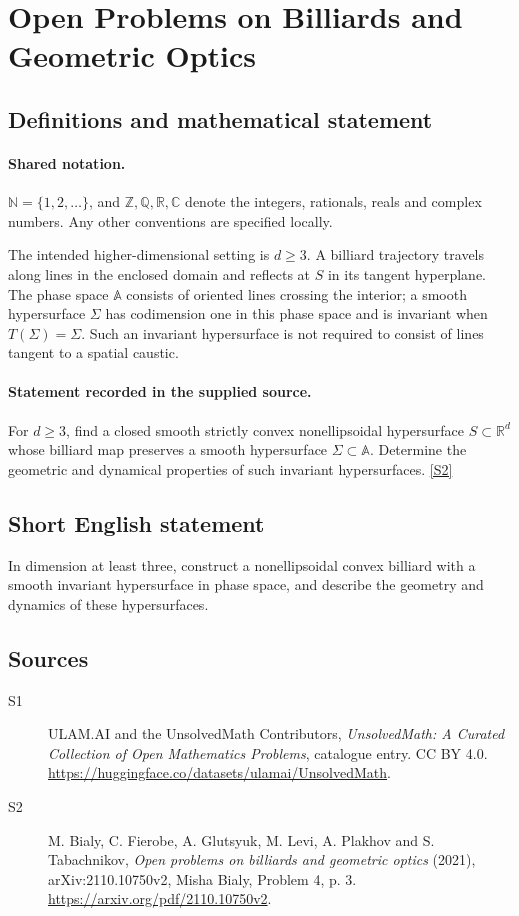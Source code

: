 \documentclass[11pt]{article}
\newcommand{\sref}[2]{\hyperlink{source:#1:#2}{[S#2]}}
\begin{document}
\section{Open Problems on Billiards and Geometric Optics}\label{statement}

\subsection{Definitions and mathematical statement}

\paragraph{Shared notation.}$\mathbb N=\{1,2,\ldots\}$, and $\mathbb Z,\mathbb Q,\mathbb R,\mathbb C$ denote the integers, rationals, reals and complex numbers. Any other conventions are specified locally.


The intended higher-dimensional setting is $d\ge3$. A billiard trajectory travels along lines in the enclosed domain and reflects at $S$ in its tangent hyperplane. The phase space $\mathbb A$ consists of oriented lines crossing the interior; a smooth hypersurface $\Sigma$ has codimension one in this phase space and is invariant when $T(\Sigma)=\Sigma$. Such an invariant hypersurface is not required to consist of lines tangent to a spatial caustic.
\paragraph{Statement recorded in the supplied source.}
For $d\ge3$, find a closed smooth strictly convex nonellipsoidal hypersurface $S\subset\mathbb R^d$ whose billiard map preserves a smooth hypersurface $\Sigma\subset\mathbb A$. Determine the geometric and dynamical properties of such invariant hypersurfaces. \sref{statement}{2}
\subsection{Short English statement}
In dimension at least three, construct a nonellipsoidal convex billiard with a smooth invariant hypersurface in phase space, and describe the geometry and dynamics of these hypersurfaces.
\subsection{Sources}
\begin{description}
\item[\hypertarget{source:statement:1}{S1}] ULAM.AI and the UnsolvedMath Contributors, \emph{UnsolvedMath: A Curated Collection of Open Mathematics Problems}, catalogue entry. CC BY 4.0. \url{https://huggingface.co/datasets/ulamai/UnsolvedMath}.
\item[\hypertarget{source:statement:2}{S2}] M. Bialy, C. Fierobe, A. Glutsyuk, M. Levi, A. Plakhov and S. Tabachnikov, \emph{Open problems on billiards and geometric optics} (2021), arXiv:2110.10750v2, Misha Bialy, Problem 4, p. 3. \url{https://arxiv.org/pdf/2110.10750v2}.
\end{description}
\label{end:statement}
\end{document}
